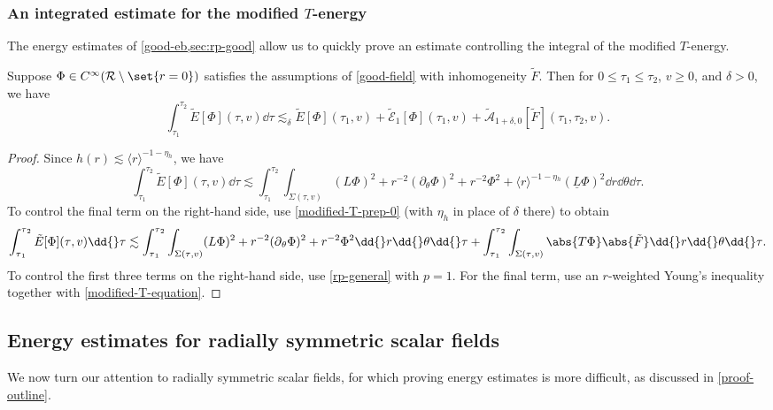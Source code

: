 \documentclass[10pt, reqno]{amsart}
\begin{document}
\subsubsection{An integrated estimate for the modified \(T\)-energy}
The energy estimates of \cref{good-eb,sec:rp-good} allow us to quickly
prove an estimate controlling the integral of the modified
\(T\)-energy.
\begin{proposition}
Suppose \(\Phi{}\in C^\infty(\mathcal{R}\setminus \set{r=0})\) satisfies the assumptions of
\cref{good-field} with inhomogeneity \(\tilde{F}\). Then for \(0\le \tau_1\le
\tau_2\), \(v\ge 0\), and \(\delta{} > 0\), we have
\begin{equation}
\int_{\tau{}_1}^{\tau{}_2} \tilde{E}[\Phi{}](\tau{},v)\dd{}\tau{} \lesssim_\delta{} \tilde{E}[\Phi{}](\tau{}_1,v) + \tilde{\mathcal{E}}_1[\Phi{}](\tau{}_1,v) + \tilde{\mathcal{A}}_{1+\delta{},0}[\tilde{F}](\tau{}_1,\tau{}_2,v).
\end{equation}
\label{integrated-modified-T}
\end{proposition}
\begin{proof}
Since \(h(r)\lesssim \langle{}r\rangle^{-1-\eta{}_{h}}\), we have
\begin{equation}
\int_{\tau{}_1}^{\tau{}_2} \tilde{E}[\Phi{}](\tau{},v)\dd{}\tau{}\lesssim \int_{\tau{}_1}^{\tau{}_2} \int _{\Sigma{}(\tau{},v)} (L\Phi{})^2 + r^{-2}(\partial{}_\theta{}\Phi{})^2 + r^{-2}\Phi^2 + \langle{}r\rangle^{-1-\eta{}_h}(\underline{L}\Phi{})^2  \dd{}r\dd{}\theta{}\dd{}\tau{}.
\end{equation}
To control the final term on the right-hand side, use \cref{modified-T-prep-0}
(with \(\eta_h\) in place of \(\delta{}\) there) to obtain
\begin{equation}
\int_{\tau{}_1}^{\tau{}_2} \tilde{E}[\Phi{}](\tau{},v)\dd{}\tau{}\lesssim \int_{\tau{}_1}^{\tau{}_2} \int _{\Sigma{}(\tau{},v)} (L\Phi{})^2 + r^{-2}(\partial{}_\theta{}\Phi{})^2 + r^{-2}\Phi^2  \dd{}r\dd{}\theta{}\dd{}\tau{} + \int_{\tau{}_1}^{\tau{}_2} \int _{\Sigma{}(\tau{},v)} \abs{T\Phi{}}\abs{\tilde{F}} \dd{}r\dd{}\theta{}\dd{}\tau{}.
\end{equation}
To control the first three terms on the right-hand side, use \cref{rp-general} with \(p
= 1\). For the final term, use an \(r\)-weighted Young's inequality together
with \cref{modified-T-equation}.
\end{proof}
\subsection{Energy estimates for radially symmetric scalar fields}
\label{axisymmetric-energy-estimates} We now turn our attention to radially
symmetric scalar fields, for which proving energy estimates is more difficult,
as discussed in \cref{proof-outline}.
\end{document}
